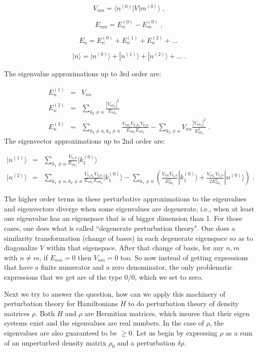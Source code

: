 \documentclass[12pt]{article}%
\newcommand{\bra}[1]{\langle#1|}
\newcommand{\ket}[1]{|#1\rangle}
\newcommand{\beq}{\begin{equation}}
\newcommand{\eeq}{\end{equation}}
\newcommand{\beqa}{\begin{eqnarray}}
\newcommand{\eeqa}{\end{eqnarray}}
\begin{document}
\beq
V_{nm} = \bra{n^{(0)}} V \ket{m^{(0)}}
\;,
\eeq

\beq
E_{nm} = E^{(0)}_n - E^{(0)}_m
\;,
\eeq

\beq
E_n = E^{(0)}_n + E^{(1)}_n +  E^{(2)}_n +\ldots
\;
\eeq

\beq
\ket{n} = \ket{n^{(0)}} +
 \ket{n^{(1)}} +\ket{n^{(2)}} + \ldots
\;.
\eeq

The eigenvalue approximations
 up to 3rd order are:


\beqa
E^{(1)}_n &=& V_{nn}
\\
E^{(2)}_n &=& \sum_{k_2\neq n}\frac{|V_{nk_2}|^2}{E_{nk_2}}
\\
E^{(3)}_n &=&
\sum_{k_2\neq n, k_3\neq n}
\frac{V_{nk_3}V_{k_3k_2}V_{k_2n}}{E_{nk_2}E_{nk_3}}
-\sum_{k_3\neq n} V_{nn}\frac{|V_{nk_3}|^2}{E^2_{nk_3}}
\;.
\eeqa
The eigenvector approximations
up to 2nd order are:

\beqa
\ket{n^{(1)}} &=&
\sum_{k_1\neq n} \frac{V_{k_1n}}{E_{nk_1}}\ket{k^{(0)}_1}
\\
\ket{n^{(2)}}&=&
\sum_{k_1\neq n, k_2\neq n}
\frac{V_{k_1k_2}V_{k_2n}}{E_{nk_1}E_{nk_2}}\ket{k_1^{(0)}}
- \sum_{k_1\neq n}\left(
\frac{V_{nn}V_{k_1n}}{E^2_{nk_1}}\ket{k^{(0)}_1}
+ \frac{V_{nk_1}V_{k_1n}}{2E_{nk_1}^2}\ket{n^{(0)}}
\right)
\;.
\eeqa

The higher order terms in
these perturbative approximations
to the eigenvalues and eigenvectors
diverge
when  some eigenvalues are degenerate,
i.e., when at least one eigenvalue
has an eigenspace that is of bigger
dimension than 1. For those cases,
one does what is called
``degenerate perturbation theory".
One does a similarity transformation
(change of bases) in each degenerate
eigenspace so as to diagonalize $V$
within that eigenspace.
After that change of
basis, for any $n,m$ with $n\neq m$,
if $E_{nm}=0$ then $V_{nm}=0$ too.
So now instead of getting expressions
that have a finite numerator and a zero
denominator, the
only problematic expressions that we get are
of the type 0/0, which we set to zero.


Next we try to answer the question, how
can we apply this machinery of perturbation
theory for Hamiltonians  $H$ to do perturbation
theory of density matrices $\rho$.
Both $H$ and $\rho$ are Hermitian matrices,
which insures that
their eigen systems exist and the eigenvalues are real
numbers. In the case of $\rho$,
the eigenvalues are also guaranteed to be $\geq 0$.
Let us begin by expressing $\rho$
as a sum of an unperturbed density matrix $\rho_0$
and a perturbation $\delta \rho$.
\end{document}

